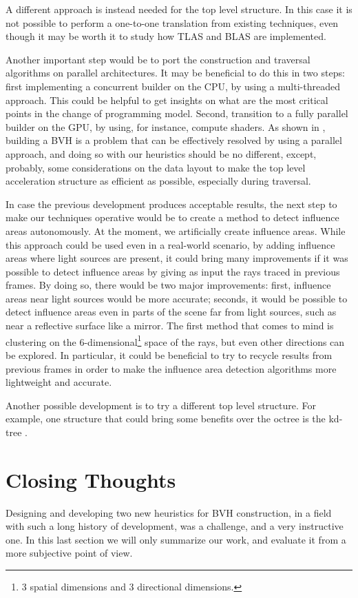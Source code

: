 \documentclass{PoliMi_MasterThesis}
\begin{document}
A different approach is instead needed for the top level structure. In this case it is not possible to perform a one-to-one translation from existing techniques, even though it may be worth it to study how TLAS and BLAS \cite{tlas_blas} are implemented.

Another important step would be to port the construction and traversal algorithms on parallel architectures. It may be beneficial to do this in two steps: first implementing a concurrent builder on the CPU, by using a multi-threaded approach. This could be helpful to get insights on what are the most critical points in the change of programming model. Second, transition to a fully parallel builder on the GPU, by using, for instance, compute shaders. As shown in \cite{parallel_bvhs}, building a BVH is a problem that can be effectively resolved by using a parallel approach, and doing so with our heuristics should be no different, except, probably, some considerations on the data layout to make the top level acceleration structure as efficient as possible, especially during traversal.

In case the previous development produces acceptable results, the next step to make our techniques operative would be to create a method to detect influence areas autonomously. At the moment, we artificially create influence areas. While this approach could be used even in a real-world scenario, by adding influence areas where light sources are present, it could bring many improvements if it was possible to detect influence areas by giving as input the rays traced in previous frames. By doing so, there would be two major improvements: first, influence areas near light sources would be more accurate; seconds, it would be possible to detect influence areas even in parts of the scene far from light sources, such as near a reflective surface like a mirror. The first method that comes to mind is clustering on the 6-dimensional\footnote{3 spatial dimensions and 3 directional dimensions.} space of the rays, but even other directions can be explored. In particular, it could be beneficial to try to recycle results from previous frames in order to make the influence area detection algorithms more lightweight and accurate.

Another possible development is to try a different top level structure. For example, one structure that could bring some benefits over the octree is the kd-tree \cite{kd_trees}.

\section{Closing Thoughts} \label{sec:closing_thoughts}
Designing and developing two new heuristics for BVH construction, in a field with such a long history of development, was a challenge, and a very instructive one. In this last section we will only summarize our work, and evaluate it from a more subjective point of view.
\end{document}
